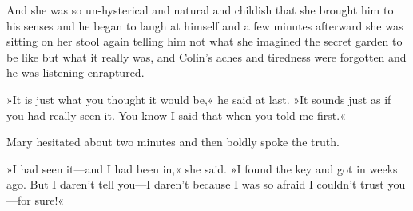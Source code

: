 And she was so un-hysterical and natural and childish that she brought him to his senses and he began to laugh at himself and a few minutes afterward she was sitting on her stool again telling him not what she imagined the secret garden to be like but what it really was, and Colin's aches and tiredness were forgotten and he was listening enraptured.

»It is just what you thought it would be,« he said at last. »It sounds just as if you had really seen it. You know I said that when you told me first.«

Mary hesitated about two minutes and then boldly spoke the truth.

»I had seen it—and I had been in,« she said. »I found the key and got in weeks ago. But I daren't tell you—I daren't because I was so afraid I couldn't trust you—for sure!«